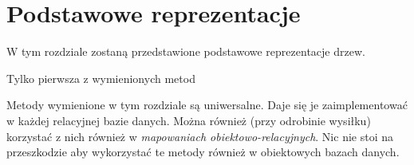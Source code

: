 \chapter{Podstawowe reprezentacje}

W tym rozdziale zostaną przedstawione podstawowe reprezentacje drzew.


Tylko pierwsza z wymienionych metod 


Metody wymienione w tym rozdziale są uniwersalne.
Daje się je zaimplementować w każdej relacyjnej bazie danych. 
Można również (przy odrobinie wysiłku) korzystać z nich również w \emph{mapowaniach obiektowo-relacyjnych}.
Nic nie stoi na przeszkodzie aby wykorzystać te metody również w obiektowych bazach danych.

